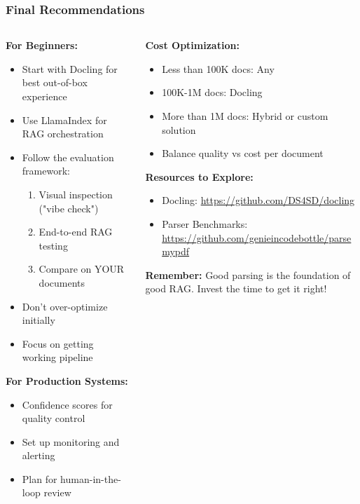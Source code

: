 \begin{frame}[fragile]\frametitle{Final Recommendations}
\begin{columns}
    \begin{column}[T]{0.5\linewidth}
      \textbf{For Beginners:}
      \begin{itemize}
        \item Start with Docling for best out-of-box experience
        \item Use LlamaIndex for RAG orchestration
        \item Follow the evaluation framework:
        \begin{enumerate}
            \item Visual inspection ("vibe check")
            \item End-to-end RAG testing
            \item Compare on YOUR documents
        \end{enumerate}
        \item Don't over-optimize initially
        \item Focus on getting working pipeline 
      \end{itemize}
      
      \textbf{For Production Systems:}
      \begin{itemize}
        \item Confidence scores for quality control
        \item Set up monitoring and alerting
        \item Plan for human-in-the-loop review
      \end{itemize}
    \end{column}
    \begin{column}[T]{0.5\linewidth}
      \textbf{Cost Optimization:}
      \begin{itemize}
        \item Less than 100K docs: Any 
        \item 100K-1M docs: Docling
        \item More than 1M docs: Hybrid or custom solution
        \item Balance quality vs cost per document
      \end{itemize}
      
      \textbf{Resources to Explore:}
      \begin{itemize}
        \item Docling: \url{https://github.com/DS4SD/docling}
        \item Parser Benchmarks: \url{https://github.com/genieincodebottle/parsemypdf}
      \end{itemize}
      
      \vspace{0.5em}
      \textbf{Remember:} Good parsing is the foundation of good RAG. Invest the time to get it right!
    \end{column}
\end{columns}
\end{frame}